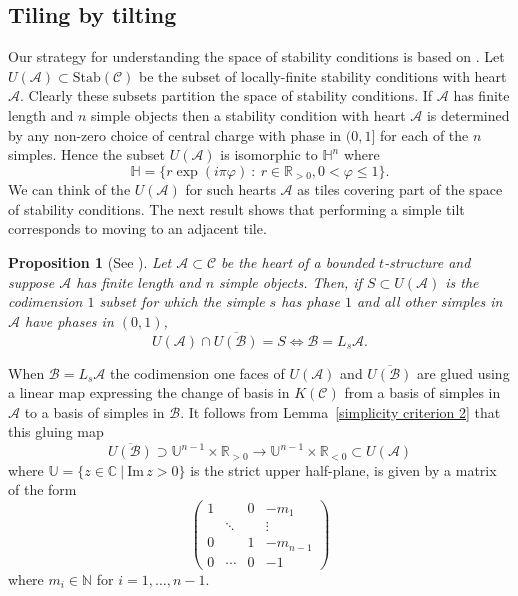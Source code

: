 \documentclass{article}
\theoremstyle{plain}
\newtheorem{proposition}[theorem]{Proposition}
\theoremstyle{definition}
\theoremstyle{remark}
\newcommand{\N}{\mathbb{N}}
\newcommand{\R}{\mathbb{R}}
\newcommand{\C}{\mathbb{C}}
\newcommand{\U}{\mathbb{H}}
\newcommand{\cat}[1]{\mathcal{#1}}
\newcommand{\stab}[1]{\mathrm{Stab}(#1)}
\begin{document}
\subsection{Tiling by tilting}
\label{main results}

Our strategy for understanding the space of stability conditions is based on \cite[\S 5]{Bridgeland:fk}. Let $U(\cat{A}) \subset \stab{\cat{C}}$ be the subset of locally-finite stability conditions with heart $\cat{A}$. 
Clearly these subsets partition the space of stability conditions. If $\cat{A}$ has finite length and $n$ simple objects then a stability condition with heart $\cat{A}$ is determined by any non-zero choice of central charge with phase in $(0,1]$ for each of the $n$ simples. Hence the subset $U(\cat{A})$ is isomorphic to $\U^n$ where
$$
\U = \{ r\exp(i\pi\varphi) \ :\ r \in \R_{>0}, 0< \varphi \leq 1 \}.
$$
We can think of the $U(\cat{A})$ for such hearts $\cat{A}$ as tiles covering part of the space of stability conditions. The next result shows that performing a simple tilt corresponds to moving to an adjacent tile. 

\begin{proposition}[{See \cite[Lemma 5.5]{Bridgeland:fk}}]
\label{tiling}
Let $\cat{A} \subset \cat{C}$ be the heart of a bounded $t$-structure and suppose $\cat{A}$ has finite length and $n$ simple objects. Then, if $S\subset U(\cat{A})$ is the codimension $1$ subset for which the simple $s$ has phase $1$ and all other simples in $\cat{A}$ have phases in $(0,1)$, 
$$
U(\cat{A}) \cap \overline{U(\cat{B})} = S \iff \cat{B} = L_s\cat{A}.
$$
\end{proposition}




When $\cat{B}=L_s\cat{A}$ the codimension one faces of $U(\cat{A})$ and $\overline{U(\cat{B})}$ are glued using a linear map expressing the change of basis in $K(\cat{C})$ from a basis of simples in $\cat{A}$ to a basis of simples in $\cat{B}$. It follows from Lemma~\ref{simplicity criterion 2} that this gluing map
$$
\overline{U(\cat{B})} \supset \mathbb{U}^{n-1} \times \R_{>0} \longrightarrow  \mathbb{U}^{n-1} \times \R_{<0} \subset U(\cat{A})
$$
where $\mathbb{U} = \{ z\in \C\ |\ \mathrm{Im}\, z >0 \}$ is the strict upper half-plane, is given by a matrix of the form
$$
\left(
\begin{array}{ccc|c}
1  &   & 0 & -m_1 \\
  & \ddots  && \vdots  \\
 0 &   & 1 &  -m_{n-1} \\
 \hline
 0&\cdots&0& -1
\end{array}
\right)
$$
where $m_i \in \N$ for $i=1,\ldots, n-1$.
\end{document}
